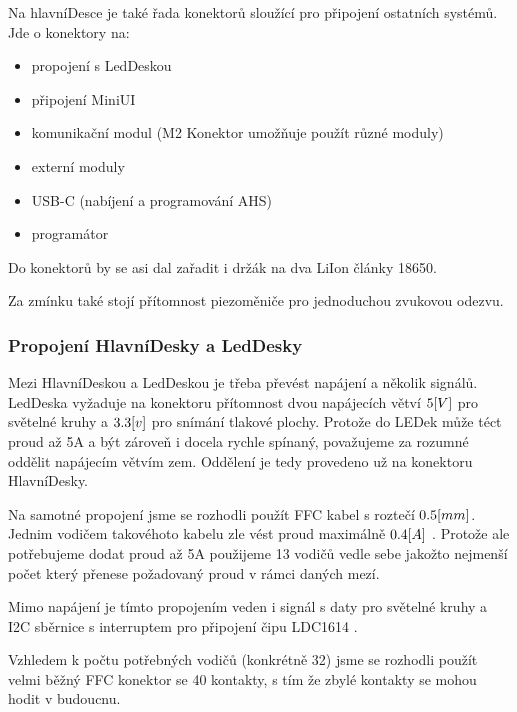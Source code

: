 Na hlavníDesce je také řada konektorů sloužící pro připojení ostatních systémů.
Jde o konektory na:
\begin{itemize}
    \item propojení s LedDeskou                                             %
    \item připojení MiniUI                                                  %
    \item komunikační modul (M2 Konektor umožňuje použít různé moduly)      %
    \item externí moduly                                                    %
    \item USB-C (nabíjení a programování AHS)                               %
    \item programátor                                                       %
\end{itemize}
Do konektorů by se asi dal zařadit i držák na dva LiIon články 18650.

Za zmínku také stojí přítomnost piezoměniče pro jednoduchou zvukovou odezvu. 

\subsubsection{Propojení HlavníDesky a LedDesky}
Mezi HlavníDeskou a LedDeskou je třeba převést napájení a několik signálů.
LedDeska vyžaduje na konektoru přítomnost dvou napájecích větví \(5\-[V]\) pro světelné kruhy a \(3.3\-[v]\) pro snímání tlakové plochy.
Protože do LEDek může téct proud až 5A a být zároveň i docela rychle spínaný, považujeme za rozumné oddělit napájecím větvím zem.
Oddělení je tedy provedeno už na konektoru HlavníDesky.

Na samotné propojení jsme se rozhodli použít FFC kabel s roztečí \(0.5\-[mm]\).
Jednim vodičem takovéhoto kabelu zle vést proud maximálně \(0.4\-[A]\) \cite{FFC-konektor}.
Protože ale potřebujeme dodat proud až 5A použijeme 13 vodičů vedle sebe jakožto nejmenší počet který přenese požadovaný proud v rámci daných mezí.

Mimo napájení je tímto propojením veden i signál s daty pro světelné kruhy a I2C sběrnice s interruptem pro připojení čipu LDC1614 \cite{LDC1614}.

Vzhledem k počtu potřebných vodičů (konkrétně 32) jsme se rozhodli použít velmi běžný FFC konektor se 40 kontakty, s tím že zbylé kontakty se mohou hodit v budoucnu.

